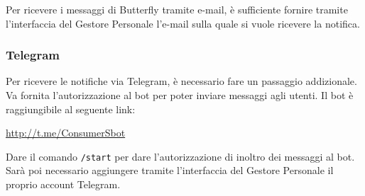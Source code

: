 Per ricevere i messaggi di Butterfly tramite e-mail, è sufficiente fornire tramite l'interfaccia del Gestore Personale l'e-mail sulla
quale si vuole ricevere la notifica.

\subsubsection{Telegram}

Per ricevere le notifiche via Telegram, è necessario fare un passaggio addizionale. Va fornita l'autorizzazione al bot per poter inviare messaggi
agli utenti. Il bot è raggiungibile al seguente link:
\begin{center}
    \url{http://t.me/ConsumerSbot}
\end{center}

Dare il comando \texttt{/start} per dare l'autorizzazione di inoltro dei messaggi al bot.
Sarà poi necessario aggiungere tramite l'interfaccia del Gestore Personale il proprio account Telegram.
